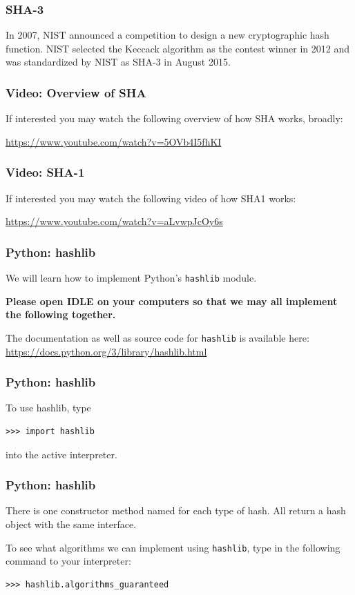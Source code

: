 \documentclass{beamer}
\newcommand{\<}{\langle}
\renewcommand{\>}{\rangle}
\begin{document}
\begin{frame}
\frametitle{SHA-3}

In 2007, NIST announced a competition to design a new cryptographic hash function. NIST selected the Keccack algorithm as the contest winner in 2012 and was standardized by NIST as SHA-3 in August 2015. 
\end{frame}

\begin{frame}
\frametitle{Video: Overview of SHA}

If interested you may watch the following overview of how SHA works, broadly:

\url{https://www.youtube.com/watch?v=5OVb4I5fhKI}
\end{frame}


\begin{frame}
\frametitle{Video: SHA-1}

If interested you may watch the following video of how SHA1 works:

\url{https://www.youtube.com/watch?v=aLvwpJcOy6s}
\end{frame}


\begin{frame}[fragile]
\frametitle{Python: hashlib}

We will learn how to implement Python's \verb|hashlib| module.\newline

\textbf{Please open IDLE on your computers so that we may all implement the following together.} \newline

The documentation as well as source code for \verb|hashlib| is available here:
\url{https://docs.python.org/3/library/hashlib.html}
\end{frame}


\begin{frame}[fragile]
\frametitle{Python: hashlib}

To use hashlib, type
\begin{verbatim}
>>> import hashlib
\end{verbatim}
into the active interpreter. 
\end{frame}



\begin{frame}[fragile]
\frametitle{Python: hashlib}

There is one constructor method named for each type of hash. All return a hash object with the same interface.\newline

To see what algorithms we can implement using \verb|hashlib|, type in the following command to your interpreter:
\begin{verbatim}
>>> hashlib.algorithms_guaranteed
\end{verbatim}
\end{frame}
\end{document}

